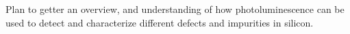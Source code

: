 Plan to getter an overview, and understanding of how photoluminescence can be used to detect and characterize different defects and impurities in silicon.